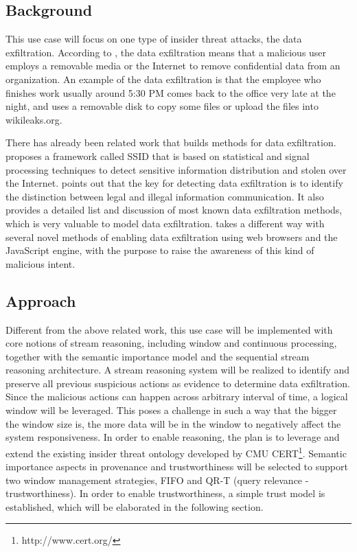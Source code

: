 \subsection{Background}
This use case will focus on one type of insider threat attacks, the data exfiltration. 
According to \cite{CMU-CERT}, the data exfiltration means that a malicious user employs a removable media or the Internet to remove confidential data from an organization.
An example of the data exfiltration is that the employee who finishes work usually around 5:30 PM comes back to the office very late at the night, and uses a removable disk to copy some files or upload the files into wikileaks.org.

There has already been related work that builds methods for data exfiltration. 
\cite{liu2009sidd} proposes a framework called SSID that is based on statistical and signal processing techniques to detect sensitive information distribution and stolen over the Internet. 
\cite{giani2006data} points out that the key for detecting data exfiltration is to identify the distinction between legal and illegal information communication. 
It also provides a detailed list and discussion of most known data exfiltration methods, which is very valuable to model data exfiltration. 
\cite{born2010browser} takes a different way with several novel methods of enabling data exfiltration using web browsers and the JavaScript engine, with the purpose to raise the awareness of this kind of malicious intent. 
%
\subsection{Approach}
Different from the above related work, this use case will be implemented with core notions of stream reasoning, including window and continuous processing, together with the semantic importance model and the sequential stream reasoning architecture. 
A stream reasoning system will be realized to identify and preserve all previous suspicious actions as evidence to determine data exfiltration.
Since the malicious actions can happen across arbitrary interval of time, a logical window will be leveraged. 
This poses a challenge in such a way that the bigger the window size is, the more data will be in the window to negatively affect the system responsiveness. 
In order to enable reasoning, the plan is to leverage and extend the existing insider threat ontology developed by CMU  CERT\footnote{http://www.cert.org/}. 
Semantic importance aspects in provenance and trustworthiness will be selected to support two window management strategies, FIFO and QR-T (query relevance - trustworthiness). 
In order to enable trustworthiness, a simple trust model is established, which will be elaborated in the following section. 
%
